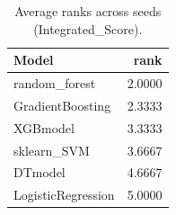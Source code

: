 \begin{table}[t]
\centering
\begin{tabular}{lr}
\toprule
Model & rank \\
\midrule
random_forest & 2.0000 \\
GradientBoosting & 2.3333 \\
XGBmodel & 3.3333 \\
sklearn_SVM & 3.6667 \\
DTmodel & 4.6667 \\
LogisticRegression & 5.0000 \\
\bottomrule
\end{tabular}
\caption{Average ranks across seeds (Integrated_Score).}
\label{tab:avg_rank_Integrated_Score}
\end{table}
